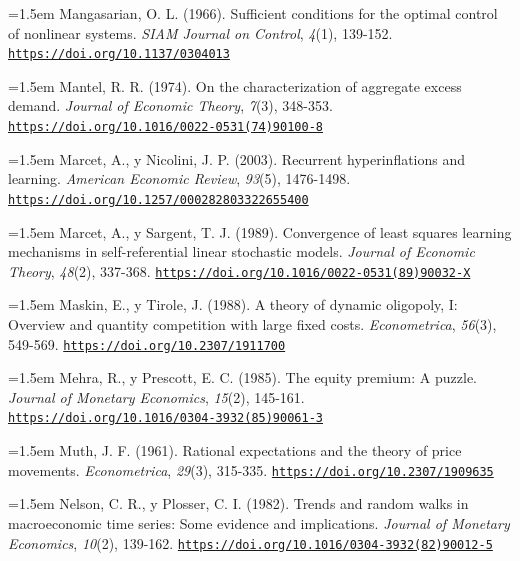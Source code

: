 \documentclass[10pt,a4paper]{article}
\begin{document}
\noindent\hangindent=1.5em Mangasarian, O. L. (1966). Sufficient conditions for the optimal control of nonlinear systems. \textit{SIAM Journal on Control}, \textit{4}(1), 139-152. \href{https://doi.org/10.1137/0304013}{\nolinkurl{https://doi.org/10.1137/0304013}}

\noindent\hangindent=1.5em Mantel, R. R. (1974). On the characterization of aggregate excess demand. \textit{Journal of Economic Theory}, \textit{7}(3), 348-353. \href{https://doi.org/10.1016/0022-0531(74)90100-8}{\nolinkurl{https://doi.org/10.1016/0022-0531(74)90100-8}}

\noindent\hangindent=1.5em Marcet, A., y Nicolini, J. P. (2003). Recurrent hyperinflations and learning. \textit{American Economic Review}, \textit{93}(5), 1476-1498. \href{https://doi.org/10.1257/000282803322655400}{\nolinkurl{https://doi.org/10.1257/000282803322655400}}

\noindent\hangindent=1.5em Marcet, A., y Sargent, T. J. (1989). Convergence of least squares learning mechanisms in self-referential linear stochastic models. \textit{Journal of Economic Theory}, \textit{48}(2), 337-368. \href{https://doi.org/10.1016/0022-0531(89)90032-X}{\nolinkurl{https://doi.org/10.1016/0022-0531(89)90032-X}}

\noindent\hangindent=1.5em Maskin, E., y Tirole, J. (1988). A theory of dynamic oligopoly, I: Overview and quantity competition with large fixed costs. \textit{Econometrica}, \textit{56}(3), 549-569. \href{https://doi.org/10.2307/1911700}{\nolinkurl{https://doi.org/10.2307/1911700}}

\noindent\hangindent=1.5em Mehra, R., y Prescott, E. C. (1985). The equity premium: A puzzle. \textit{Journal of Monetary Economics}, \textit{15}(2), 145-161. \href{https://doi.org/10.1016/0304-3932(85)90061-3}{\nolinkurl{https://doi.org/10.1016/0304-3932(85)90061-3}}

\noindent\hangindent=1.5em Muth, J. F. (1961). Rational expectations and the theory of price movements. \textit{Econometrica}, \textit{29}(3), 315-335. \href{https://doi.org/10.2307/1909635}{\nolinkurl{https://doi.org/10.2307/1909635}}

\noindent\hangindent=1.5em Nelson, C. R., y Plosser, C. I. (1982). Trends and random walks in macroeconomic time series: Some evidence and implications. \textit{Journal of Monetary Economics}, \textit{10}(2), 139-162. \href{https://doi.org/10.1016/0304-3932(82)90012-5}{\nolinkurl{https://doi.org/10.1016/0304-3932(82)90012-5}}
\end{document}
